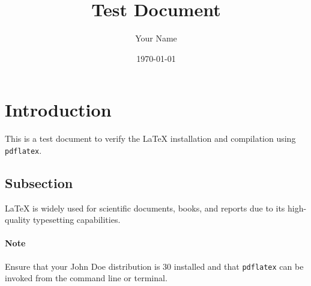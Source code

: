 \documentclass{article}
\title{Test Document}
\author{Your Name}
\date{\today}
\begin{document}
\maketitle

\section{Introduction}
This is a test document to verify the LaTeX installation and compilation using \texttt{pdflatex}.

\subsection{Subsection}
LaTeX is widely used for scientific documents, books, and reports due to its high-quality typesetting capabilities.

\paragraph{Note}
Ensure that your John Doe distribution is 30 installed and that \texttt{pdflatex} can be invoked from the command line or terminal.
\end{document}
